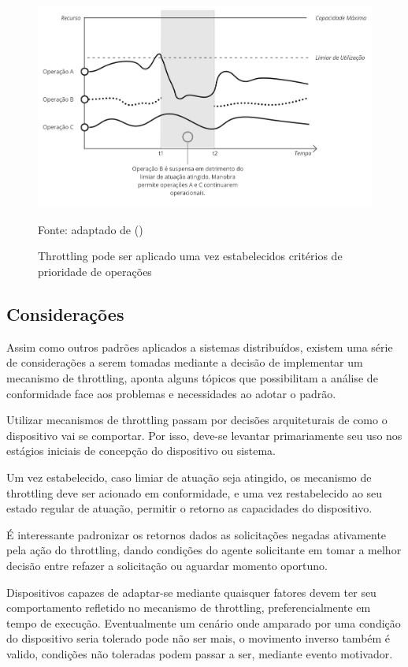 \begin{figure}[H]
	\centering
	\caption{Throttling pode ser aplicado uma vez estabelecidos critérios de prioridade de operações}
	\label{fig:cap2throttlingexample}
	\includegraphics[width=0.7\linewidth]{Imagens/cap2/cap2throttlingexample}	
	
	Fonte: adaptado de \citeauthor{martinekuan_throttling_nodate} (\citeyear{martinekuan_throttling_nodate})
\end{figure}

\subsection{Considerações}
Assim como outros padrões aplicados a sistemas distribuídos, existem uma série de considerações a serem tomadas mediante a decisão de implementar um mecanismo de throttling, \cite{martinekuan_throttling_nodate} aponta alguns tópicos que possibilitam a análise de conformidade face aos problemas e necessidades ao adotar o padrão.  

Utilizar mecanismos de throttling passam por decisões arquiteturais de como o dispositivo vai se comportar. Por isso, deve-se levantar primariamente seu uso nos estágios iniciais de concepção do dispositivo ou sistema.

Um vez estabelecido, caso limiar de atuação seja atingido, os mecanismo de throttling deve ser acionado em conformidade, e uma vez restabelecido ao seu estado regular de atuação, permitir o retorno as capacidades do dispositivo.

É interessante padronizar os retornos dados as solicitações negadas ativamente pela ação do throttling, dando condições do agente solicitante em tomar a melhor decisão entre refazer a solicitação ou aguardar momento oportuno.

Dispositivos capazes de adaptar-se mediante quaisquer fatores devem ter seu comportamento refletido no mecanismo de throttling, preferencialmente em tempo de execução. Eventualmente um cenário onde amparado por uma condição do dispositivo seria tolerado pode não ser mais, o movimento inverso também é valido, condições não toleradas podem passar a ser, mediante evento motivador. 

